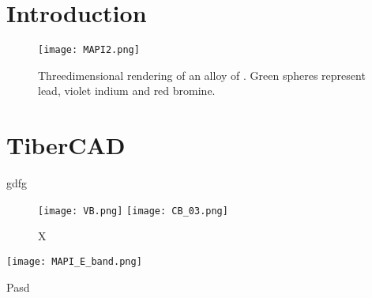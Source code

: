 \documentclass[11pt]{article} %
\let\stdsection\section
\renewcommand\section{\newpage\stdsection}
\begin{document}
\newpage %


\section{Introduction} %

\begin{figure}[]
\centering 
\texttt{[image: MAPI2.png]}
\caption{Threedimensional rendering of an alloy of . Green spheres represent lead, violet indium and red bromine.}
\label{fig:3dd}
\end{figure}

\section{TiberCAD}
gdfg

\begin{figure}[]
\centering 
\texttt{[image: VB.png]}
\texttt{[image: CB\_03.png]}
\caption{X}
\label{fig:result}
\end{figure}



\begin{sidewaystable}[counterclockwise]
\centering 
\texttt{[image: MAPI\_E\_band.png]}
\caption{Pasd}
\label{fig:MAPI_E_band}
\end{sidewaystable} 
\end{document}
